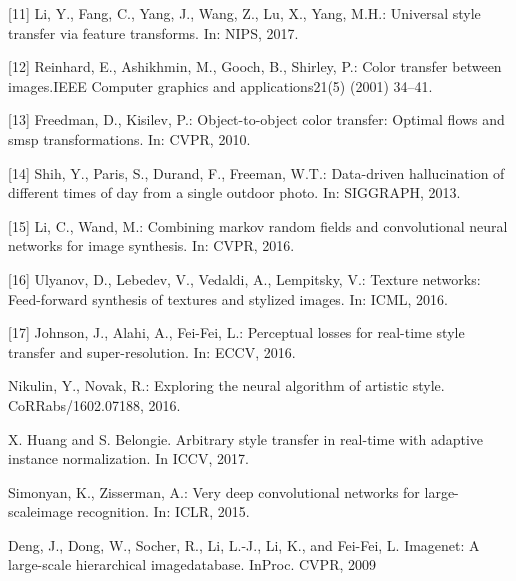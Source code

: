 \begin{thebibliography}{9}
[11] Li, Y., Fang, C., Yang, J., Wang, Z., Lu, X., Yang, M.H.:  Universal style transfer via feature transforms.  In: NIPS, 2017. 

[12] Reinhard, E., Ashikhmin, M., Gooch, B., Shirley, P.: Color transfer between images.IEEE Computer graphics and applications21(5) (2001) 34–41.

[13] Freedman, D., Kisilev, P.:  Object-to-object color transfer: Optimal flows and smsp transformations.  In: CVPR, 2010. 

[14] Shih,  Y.,  Paris,  S.,  Durand,  F.,  Freeman,  W.T.:   Data-driven  hallucination  of different times of day from a single outdoor photo.  In: SIGGRAPH, 2013.  

[15] Li,  C.,  Wand,  M.:   Combining  markov  random  fields  and  convolutional  neural networks for image synthesis.  In: CVPR, 2016. 

[16] Ulyanov, D., Lebedev, V., Vedaldi, A., Lempitsky, V.:  Texture networks: Feed-forward synthesis of textures and stylized images.  In: ICML, 2016.

[17] Johnson, J., Alahi, A., Fei-Fei, L.:  Perceptual losses for real-time style transfer and super-resolution.  In: ECCV, 2016.

Nikulin,  Y.,  Novak,  R.:  Exploring  the  neural  algorithm  of  artistic  style.  CoRRabs/1602.07188, 2016.

X. Huang and S. Belongie. Arbitrary style transfer in real-time with adaptive instance normalization. In
ICCV, 2017.

Simonyan, K., Zisserman, A.:  Very deep convolutional networks for large-scaleimage recognition.  In: ICLR, 2015.

Deng, J., Dong, W., Socher, R., Li, L.-J., Li, K., and Fei-Fei, L.  Imagenet:  A large-scale hierarchical imagedatabase.  InProc. CVPR, 2009
\end{thebibliography}